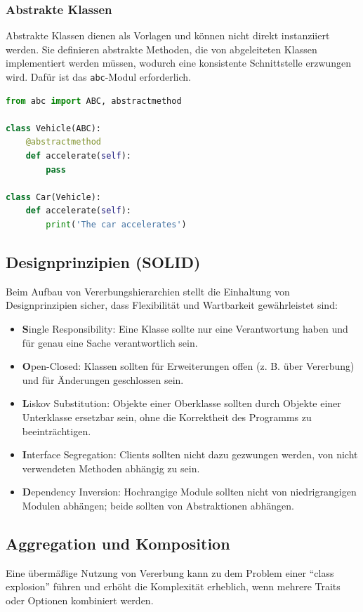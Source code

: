 \subsubsection{Abstrakte Klassen}
Abstrakte Klassen dienen als Vorlagen und können nicht direkt instanziiert werden. Sie definieren abstrakte Methoden, die von abgeleiteten Klassen implementiert werden müssen, wodurch eine konsistente Schnittstelle erzwungen wird. Dafür ist das \texttt{abc}-Modul erforderlich.

\begin{lstlisting}[language=Python]
from abc import ABC, abstractmethod

class Vehicle(ABC):
    @abstractmethod
    def accelerate(self):
        pass

class Car(Vehicle):
    def accelerate(self):
        print('The car accelerates')
\end{lstlisting}

\subsection{Designprinzipien (SOLID)}
Beim Aufbau von Vererbungshierarchien stellt die Einhaltung von Designprinzipien sicher, dass Flexibilität und Wartbarkeit gewährleistet sind:
\begin{itemize}
    \item \textbf{S}ingle Responsibility: Eine Klasse sollte nur eine Verantwortung haben und für genau eine Sache verantwortlich sein.
    \item \textbf{O}pen-Closed: Klassen sollten für Erweiterungen offen (z. B. über Vererbung) und für Änderungen geschlossen sein.
    \item \textbf{L}iskov Substitution: Objekte einer Oberklasse sollten durch Objekte einer Unterklasse ersetzbar sein, ohne die Korrektheit des Programms zu beeinträchtigen.
    \item \textbf{I}nterface Segregation: Clients sollten nicht dazu gezwungen werden, von nicht verwendeten Methoden abhängig zu sein.
    \item \textbf{D}ependency Inversion: Hochrangige Module sollten nicht von niedrigrangigen Modulen abhängen; beide sollten von Abstraktionen abhängen.
\end{itemize}

\subsection{Aggregation und Komposition}
Eine übermäßige Nutzung von Vererbung kann zu dem Problem einer ``class explosion'' führen und erhöht die 
Komplexität erheblich, wenn mehrere Traits oder Optionen kombiniert werden. 

